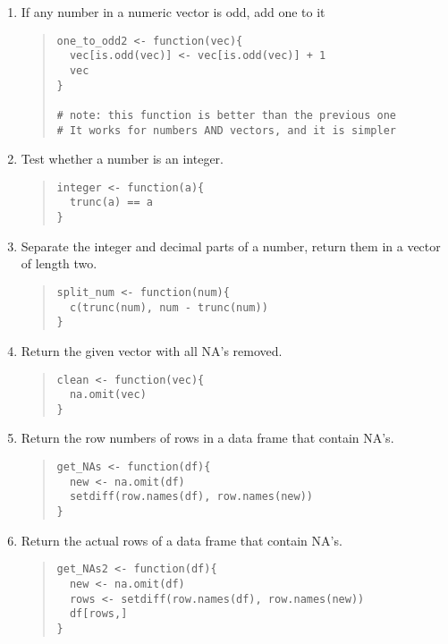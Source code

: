 \documentclass{article}
\begin{document}
\begin{enumerate}
\item If any number in a numeric vector is odd, add one to it
  \begin{quote}
    \begin{verbatim}
one_to_odd2 <- function(vec){
  vec[is.odd(vec)] <- vec[is.odd(vec)] + 1
  vec
}	

# note: this function is better than the previous one
# It works for numbers AND vectors, and it is simpler
    \end{verbatim}
  \end{quote}

\item Test whether a number is an integer.
  \begin{quote}
    \begin{verbatim}
integer <- function(a){
  trunc(a) == a
}
    \end{verbatim}
  \end{quote}

\item Separate the integer and decimal parts of a number, return them in a vector of length two.
  \begin{quote}
    \begin{verbatim}
split_num <- function(num){
  c(trunc(num), num - trunc(num))
}
    \end{verbatim}
  \end{quote}

\item Return the given vector with all NA's removed.
  \begin{quote}
    \begin{verbatim}
clean <- function(vec){
  na.omit(vec)
}
    \end{verbatim}
  \end{quote}



\item Return the row numbers of rows in a data frame that contain NA's.
  \begin{quote}
    \begin{verbatim}
get_NAs <- function(df){
  new <- na.omit(df)
  setdiff(row.names(df), row.names(new))
}
    \end{verbatim}
  \end{quote}
  
\item Return the actual rows of a data frame that contain NA's.
  \begin{quote}
    \begin{verbatim}
get_NAs2 <- function(df){
  new <- na.omit(df)
  rows <- setdiff(row.names(df), row.names(new))
  df[rows,]
}
    \end{verbatim}
  \end{quote}
  

\end{enumerate}
\end{document}
